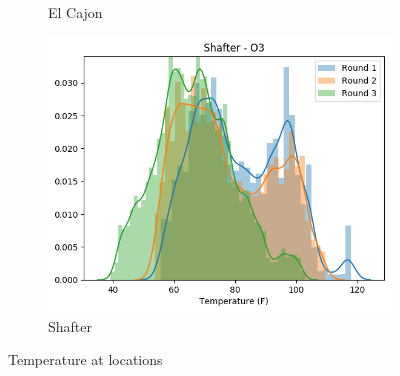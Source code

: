 \documentclass[journal abbreviation, manuscript]{copernicus}
\begin{document}
\begin{figure}[H]
\begin{subfigure}{0.32\textwidth}
\caption{El Cajon}
\end{subfigure}
\begin{subfigure}{0.32\textwidth}
\includegraphics[width=\textwidth]{results/distributions/location_shafter_temperature.png}
\caption{Shafter}
\end{subfigure}
\caption{Temperature at locations}
\label{fig:temperature-locations}
\end{figure}
\end{document}
